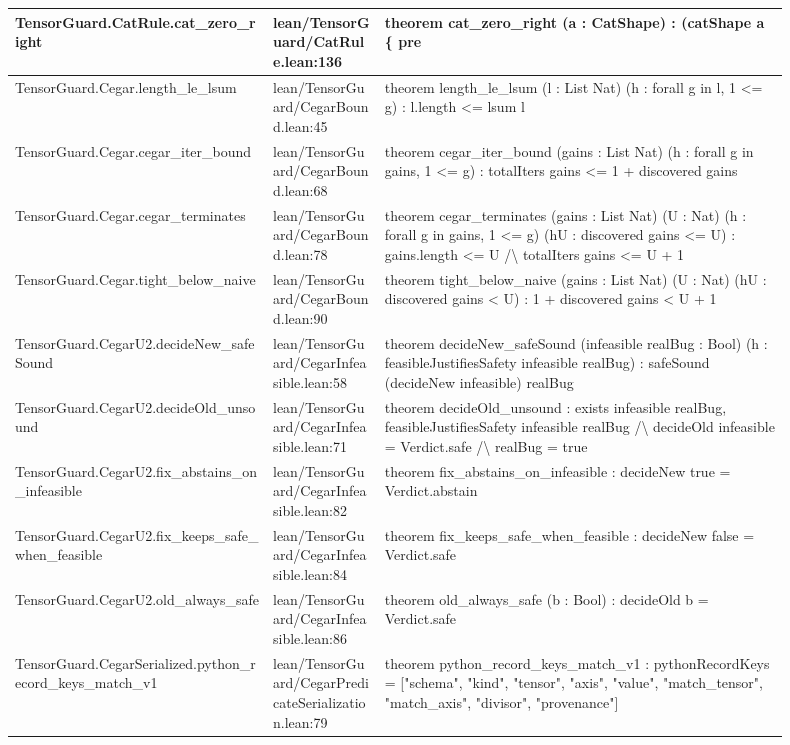 \documentclass[10pt]{article}
\begin{document}
\begin{longtable}{|p{0.30\linewidth}|p{0.13\linewidth}|p{0.47\linewidth}|}
\hline
TensorGuard.CatRule.cat\_zero\_right & lean/TensorGuard/CatRule.lean:136 & theorem cat\_zero\_right (a : CatShape) : (catShape a \{ pre \\
\hline
TensorGuard.Cegar.length\_le\_lsum & lean/TensorGuard/CegarBound.lean:45 & theorem length\_le\_lsum (l : List Nat) (h : forall g in l, 1 <= g) : l.length <= lsum l \\
\hline
TensorGuard.Cegar.cegar\_iter\_bound & lean/TensorGuard/CegarBound.lean:68 & theorem cegar\_iter\_bound (gains : List Nat) (h : forall g in gains, 1 <= g) : totalIters gains <= 1 + discovered gains \\
\hline
TensorGuard.Cegar.cegar\_terminates & lean/TensorGuard/CegarBound.lean:78 & theorem cegar\_terminates (gains : List Nat) (U : Nat) (h : forall g in gains, 1 <= g) (hU : discovered gains <= U) : gains.length <= U /\textbackslash{} totalIters gains <= U + 1 \\
\hline
TensorGuard.Cegar.tight\_below\_naive & lean/TensorGuard/CegarBound.lean:90 & theorem tight\_below\_naive (gains : List Nat) (U : Nat) (hU : discovered gains < U) : 1 + discovered gains < U + 1 \\
\hline
TensorGuard.CegarU2.decideNew\_safeSound & lean/TensorGuard/CegarInfeasible.lean:58 & theorem decideNew\_safeSound (infeasible realBug : Bool) (h : feasibleJustifiesSafety infeasible realBug) : safeSound (decideNew infeasible) realBug \\
\hline
TensorGuard.CegarU2.decideOld\_unsound & lean/TensorGuard/CegarInfeasible.lean:71 & theorem decideOld\_unsound : exists infeasible realBug, feasibleJustifiesSafety infeasible realBug /\textbackslash{} decideOld infeasible = Verdict.safe /\textbackslash{} realBug = true \\
\hline
TensorGuard.CegarU2.fix\_abstains\_on\_infeasible & lean/TensorGuard/CegarInfeasible.lean:82 & theorem fix\_abstains\_on\_infeasible : decideNew true = Verdict.abstain \\
\hline
TensorGuard.CegarU2.fix\_keeps\_safe\_when\_feasible & lean/TensorGuard/CegarInfeasible.lean:84 & theorem fix\_keeps\_safe\_when\_feasible : decideNew false = Verdict.safe \\
\hline
TensorGuard.CegarU2.old\_always\_safe & lean/TensorGuard/CegarInfeasible.lean:86 & theorem old\_always\_safe (b : Bool) : decideOld b = Verdict.safe \\
\hline
TensorGuard.CegarSerialized.python\_record\_keys\_match\_v1 & lean/TensorGuard/CegarPredicateSerialization.lean:79 & theorem python\_record\_keys\_match\_v1 : pythonRecordKeys = ["schema", "kind", "tensor", "axis", "value", "match\_tensor", "match\_axis", "divisor", "provenance"] \\

\end{longtable}
\end{document}
